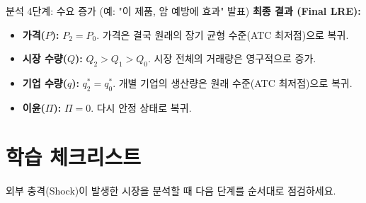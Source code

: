 \documentclass[11pt,a4paper]{article}
\theoremstyle{definition}
\begin{document}
\begin{mybox}{분석 4단계: 수요 증가 (예: "이 제품, 암 예방에 효과" 발표)}
\textbf{최종 결과 (Final LRE):}
\begin{itemize}
    \item \textbf{가격($P$):} $P_2 = P_0$. 가격은 결국 원래의 장기 균형 수준(ATC 최저점)으로 복귀.
    \item \textbf{시장 수량($Q$):} $Q_2 > Q_1 > Q_0$. 시장 전체의 거래량은 영구적으로 증가.
    \item \textbf{기업 수량($q$):} $q_2^* = q_0^*$. 개별 기업의 생산량은 원래 수준(ATC 최저점)으로 복귀.
    \item \textbf{이윤($\Pi$):} $\Pi = 0$. 다시 안정 상태로 복귀.
\end{itemize}
\end{mybox}

\newpage
\section{학습 체크리스트}

외부 충격(Shock)이 발생한 시장을 분석할 때 다음 단계를 순서대로 점검하세요.
\end{document}
